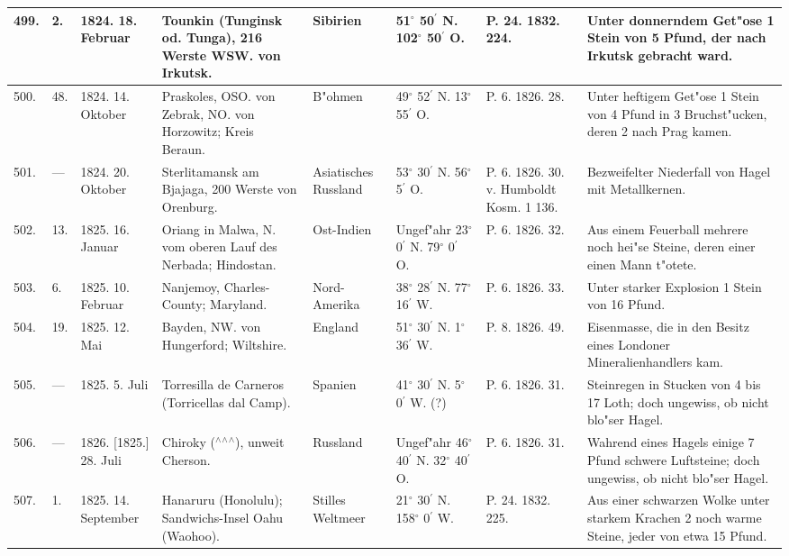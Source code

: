 \documentclass[a4paper, 8pt, oneside, polutonikogreek, german]{article}
\begin{document}
\begin{center}
\begin{longtable}{| p{5mm} | p{3mm} | p{15mm} | p{25mm} | p{20mm} | p{14mm} | p{17mm} | p{24mm} |}
        499. & 2. & 1824. 18. Februar & Tounkin (Tunginsk od. Tunga), 216 Werste WSW. von Irkutsk. & Sibirien & 51$^\circ$ 50$^\prime$ N. 102$^\circ$ 50$^\prime$ O. & P. 24. 1832. 224. & Unter donnerndem Get"ose 1 Stein von 5 Pfund, der nach Irkutsk gebracht ward. \\ \hline
        500. & 48. & 1824. 14. Oktober & Praskoles, OSO. von Zebrak, NO. von Horzowitz; Kreis Beraun. & B"ohmen & 49$^\circ$ 52$^\prime$ N. 13$^\circ$ 55$^\prime$ O. & P. 6. 1826. 28. & Unter heftigem Get"ose 1 Stein von 4 Pfund in 3 Bruchst"ucken, deren 2 nach Prag kamen. \\ \hline
        501. & --- & 1824. 20. Oktober & Sterlitamansk am Bjajaga, 200 Werste von Orenburg. & Asiatisches Russland & 53$^\circ$ 30$^\prime$ N. 56$^\circ$ 5$^\prime$ O. & P. 6. 1826. 30. v. Humboldt Kosm. 1 136. & Bezweifelter Niederfall von Hagel mit Metallkernen. \\ \hline
        502. & 13. & 1825. 16. Januar & Oriang in Malwa, N. vom oberen Lauf des Nerbada; Hindostan. & Ost-Indien & Ungef"ahr 23$^\circ$ 0$^\prime$ N. 79$^\circ$ 0$^\prime$ O. & P. 6. 1826. 32. & Aus einem Feuerball mehrere noch hei"se Steine, deren einer einen Mann t"otete. \\ \hline
        503. & 6. & 1825. 10. Februar & Nanjemoy, Charles-County; Maryland. & Nord-Amerika & 38$^\circ$ 28$^\prime$ N. 77$^\circ$ 16$^\prime$ W. & P. 6. 1826. 33. & Unter starker Explosion 1 Stein von 16 Pfund. \\ \hline
        504. & 19. & 1825. 12. Mai & Bayden, NW. von Hungerford; Wiltshire. & England & 51$^\circ$ 30$^\prime$ N. 1$^\circ$ 36$^\prime$ W. & P. 8. 1826. 49. & Eisenmasse, die in den Besitz eines Londoner Mineralienhandlers kam. \\ \hline
        505. & --- & 1825. 5. Juli & Torresilla de Carneros (Torricellas dal Camp). & Spanien & 41$^\circ$ 30$^\prime$ N. 5$^\circ$ 0$^\prime$ W. (?) & P. 6. 1826. 31. & Steinregen in Stucken von 4 bis 17 Loth; doch ungewiss, ob nicht blo"ser Hagel. \\ \hline
        506. & --- & 1826. [1825.] 28. Juli & Chiroky ($^\wedge$$^\wedge$$^\wedge$), unweit Cherson. & Russland & Ungef"ahr 46$^\circ$ 40$^\prime$ N. 32$^\circ$ 40$^\prime$ O. & P. 6. 1826. 31. & Wahrend eines Hagels einige 7 Pfund schwere Luftsteine; doch ungewiss, ob nicht blo"ser Hagel. \\ \hline
        507. & 1. & 1825. 14. September & Hanaruru (Honolulu); Sandwichs-Insel Oahu (Waohoo). & Stilles Weltmeer & 21$^\circ$ 30$^\prime$ N. 158$^\circ$ 0$^\prime$ W. & P. 24. 1832. 225. & Aus einer schwarzen Wolke unter starkem Krachen 2 noch warme Steine, jeder von etwa 15 Pfund. \\ \hline

\end{longtable}
\end{center}
\end{document}
